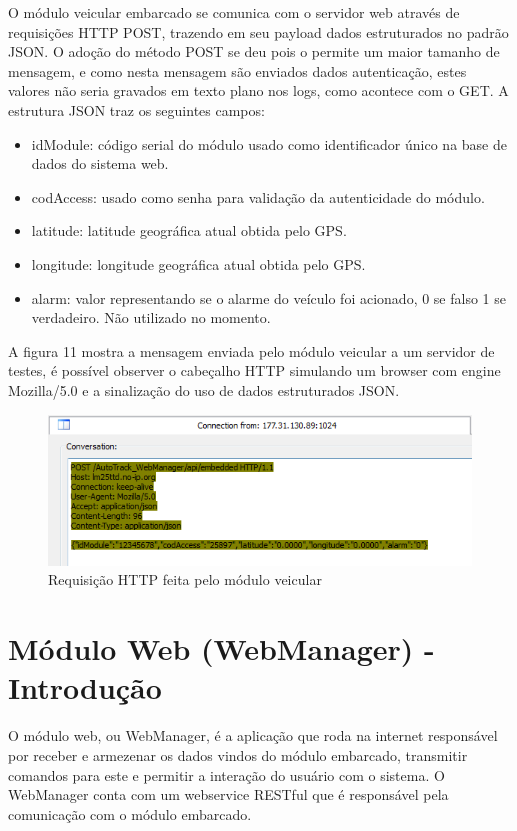 O módulo veicular embarcado se comunica com o servidor web através de requisições HTTP POST, trazendo em seu
payload dados estruturados no padrão JSON. O adoção do método POST se deu pois o permite um maior tamanho de
mensagem, e como nesta mensagem são enviados dados autenticação, estes valores não seria gravados em texto
plano nos logs, como acontece com o GET. A estrutura JSON traz os seguintes campos:

\begin{itemize}
	\item idModule: código serial do módulo usado como identificador único na base de dados do sistema web.
	\item codAccess: usado como senha para validação da autenticidade do módulo.
	\item latitude: latitude geográfica atual obtida pelo GPS.
	\item longitude: longitude geográfica atual obtida pelo GPS.
	\item alarm: valor representando se o alarme do veículo foi acionado, 0 se falso 1 se verdadeiro. Não utilizado no momento.
\end{itemize}

A figura 11 mostra a mensagem enviada pelo módulo veicular a um servidor de testes, é possível observer o cabeçalho HTTP simulando um browser com engine Mozilla/5.0 e a sinalização do uso de dados estruturados JSON.


\begin{figure}[!htb]
	\centering
	\includegraphics[width=7.00cm\textwidth]{figures/requisicao_post.png}
	\caption{Requisição HTTP feita pelo módulo veicular}
	\label{Figura 11}
\end{figure}

\section{Módulo Web (WebManager) - Introdução}

O módulo web, ou WebManager, é a aplicação que roda na internet responsável por receber e armezenar os dados vindos do módulo embarcado, transmitir comandos para este e permitir a interação do usuário com o sistema. O WebManager conta com um webservice RESTful que é responsável pela comunicação com o módulo embarcado.

